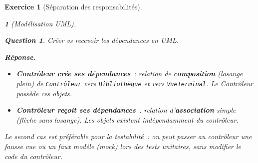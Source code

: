 \documentclass{article}
\theoremstyle{exostyle}
\newtheorem{exo}{Exercice}
\theoremstyle{partiestyle}
\newtheorem{partie}{}[exo]
\theoremstyle{questionstyle}
\newtheorem{questionpartie}{Question}[partie]
\newenvironment{reponse}{%
    \par\smallskip\noindent\textbf{Réponse.}\enspace\ignorespaces
}{%
    \par\smallskip
}
\begin{document}
\begin{exo}[Séparation des responsabilités]
\begin{partie}[Modélisation UML]
        \begin{questionpartie}
            Créer vs recevoir les dépendances en UML.
        \end{questionpartie}
        \begin{reponse}
            \begin{itemize}
                \item \textbf{Contrôleur crée ses dépendances}~: relation de \textbf{composition} (losange plein) de \texttt{Contrôleur} vers \texttt{Bibliothèque} et vers \texttt{VueTerminal}. Le Contrôleur possède ces objets.
                \item \textbf{Contrôleur reçoit ses dépendances}~: relation d'\textbf{association} simple (flèche sans losange). Les objets existent indépendamment du contrôleur.
            \end{itemize}
            Le second cas est préférable pour la testabilité~: on peut passer au contrôleur une fausse vue ou un faux modèle (\textit{mock}) lors des tests unitaires, sans modifier le code du contrôleur.
        \end{reponse}

    \end{partie}
\end{exo}
\end{document}
